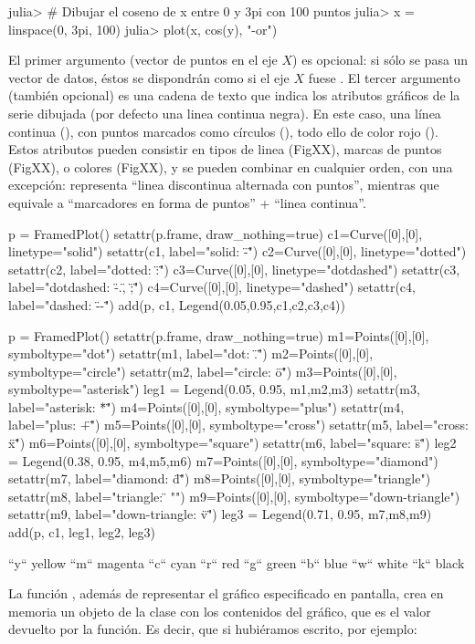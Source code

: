 ﻿\documentclass[spanish]{article}
\begin{document}
julia> # Dibujar el coseno de x entre 0 y 3pi con 100 puntos
julia> x = linspace(0, 3pi, 100)
julia> plot(x, cos(y), "-or")

El primer argumento (vector de puntos en el eje $X$) es opcional: si sólo
se pasa un vector de datos, éstos se dispondrán como si el eje $X$ fuese
\code{[1:length(y)]}. El tercer argumento (también opcional)
es una cadena de texto que indica los atributos gráficos de la serie dibujada
(por defecto una linea continua negra). En este caso, una línea continua
(), con puntos marcados como círculos (),
todo ello de color rojo (). Estos atributos pueden consistir
en tipos de linea (FigXX), marcas de puntos (FigXX), o colores (FigXX),
y se pueden combinar en cualquier orden, con una excepción:
 representa ``linea discontinua alternada con puntos'', mientras
que  equivale a ``marcadores en forma de puntos'' + 
``linea continua''.


p = FramedPlot()
setattr(p.frame, draw_nothing=true)
c1=Curve([0],[0], linetype="solid")
setattr(c1, label="solid: \"-\"")
c2=Curve([0],[0], linetype="dotted")
setattr(c2, label="dotted: \":\"")
c3=Curve([0],[0], linetype="dotdashed")
setattr(c3, label="dotdashed: \"-.\", \";\"")
c4=Curve([0],[0], linetype="dashed")
setattr(c4, label="dashed: \"--\"")
add(p, c1, Legend(0.05,0.95,{c1,c2,c3,c4}))

p = FramedPlot()
setattr(p.frame, draw_nothing=true)
m1=Points([0],[0], symboltype="dot")
setattr(m1, label="dot: \".\"")
m2=Points([0],[0], symboltype="circle")
setattr(m2, label="circle: \"o\"")
m3=Points([0],[0], symboltype="asterisk")
leg1 = Legend(0.05, 0.95, {m1,m2,m3})
setattr(m3, label="asterisk: \"*\"")
m4=Points([0],[0], symboltype="plus")
setattr(m4, label="plus: \"+\"")
m5=Points([0],[0], symboltype="cross")
setattr(m5, label="cross: \"x\"")
m6=Points([0],[0], symboltype="square")
setattr(m6, label="square: \"s\"")
leg2 = Legend(0.38, 0.95, {m4,m5,m6})
m7=Points([0],[0], symboltype="diamond")
setattr(m7, label="diamond: \"d\"")
m8=Points([0],[0], symboltype="triangle")
setattr(m8, label="triangle: \"^^\"")
m9=Points([0],[0], symboltype="down-triangle")
setattr(m9, label="down-triangle: \"v\"")
leg3 = Legend(0.71, 0.95, {m7,m8,m9})
add(p, c1, leg1, leg2, leg3)

``y``     yellow
``m``     magenta
``c``     cyan
``r``     red
``g``     green
``b``     blue
``w``     white
``k``     black

La función , además de representar el gráfico especificado
en pantalla, crea en memoria un objeto de la clase  con
los contenidos del gráfico, que es el valor devuelto por la función.
Es decir, que si hubiéramos escrito, por ejemplo:
\end{document}
